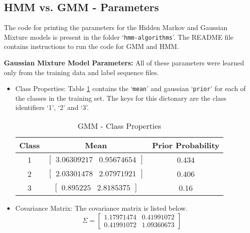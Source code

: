 \documentclass[parskip=half]{scrartcl}
\begin{document}
    \subsection{HMM vs. GMM - Parameters} %
    \label{sub:hmm_vs_gmm_parameters}

        The code for printing the parameters for the Hidden Markov and Gaussian Mixture models is present in the folder `\texttt{hmm-algorithms}'. The README file contains instructions to run the code for GMM and HMM.

        \textbf{Gaussian Mixture Model Parameters:}
        All of these parameters were learned only from the training data and label sequence files.
        \begin{itemize}

            \item 
            Class Properties: Table \ref{tab:gmm_class_properties} contains the `\texttt{mean}' and gaussian `\texttt{prior}' for each of the classes in the training set. The keys for this dictonary are the class identifiers `1', `2' and `3'.
            \begin{table}[ht]
                \centering
                \begin{tabular}{| c | c | c |}
                \hline
                \textbf{Class} & \textbf{Mean} & \textbf{Prior Probability} \\
                \hline
                \hline
                    1 & $\begin{bmatrix}3.06309217 & 0.95674654\end{bmatrix}$ & 0.434 \\
                \hline
                    2 & $\begin{bmatrix}2.03301478 & 2.07971921\end{bmatrix}$ & 0.406 \\
                \hline
                    3 & $\begin{bmatrix}0.895225 & 2.8185375\end{bmatrix}$ & 0.16 \\
                \hline
                \end{tabular}
                \caption{GMM - Class Properties}
                \label{tab:gmm_class_properties}
            \end{table}
            \item 
            Covariance Matrix: The covariance matrix is listed below. 
            $$\Sigma = 
                \begin{bmatrix}
                    1.17971474 & 0.41991072 \\
                    0.41991072 & 1.09360673 
                \end{bmatrix}$$

        \end{itemize}
    
\end{document}
